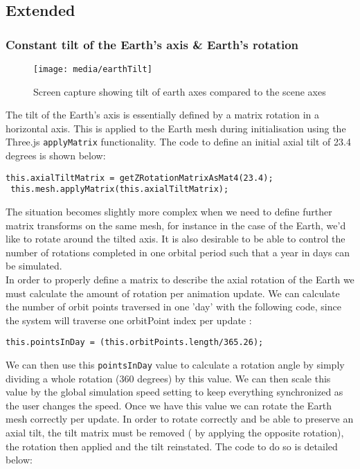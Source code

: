 \documentclass[titlepage]{article}
\begin{document}
\subsection{Extended}
\subsubsection{Constant tilt of the Earth’s axis \& Earth's rotation}

\begin{figure}[h!]
                \centering
                \texttt{[image: media/earthTilt]}
                \caption{Screen capture showing tilt of earth axes compared to the scene axes}
\end{figure}

The tilt of the Earth's axis is essentially defined by a matrix rotation in a horizontal axis. This is applied to the Earth mesh during initialisation using the Three.js \texttt{applyMatrix} functionality. The code to define an initial axial tilt of 23.4 degrees is shown below:
\begin{lstlisting}[caption=Code taken from Earth.js]
this.axialTiltMatrix = getZRotationMatrixAsMat4(23.4);
 this.mesh.applyMatrix(this.axialTiltMatrix);
\end{lstlisting}


The situation becomes slightly more complex when we need to define further matrix transforms on the same mesh, for instance in the case of the Earth, we'd like to rotate around the tilted axis. It is also desirable to be able to control the number of rotations completed in one orbital period such that a year in days can be simulated.
\\ 
In order to properly define a matrix to describe the axial rotation of the Earth we must calculate the amount of rotation per animation update. We can calculate the number of orbit points traversed in one 'day' with the following code, since the system will traverse one orbitPoint index per update :

\begin{lstlisting}[caption=Code taken from Earth.js]
 this.pointsInDay = (this.orbitPoints.length/365.26);
\end{lstlisting}
We can then use this \texttt{pointsInDay} value to calculate a rotation angle by simply dividing a whole rotation (360 degrees) by this value. We can then scale this value by the global simulation speed setting to keep everything synchronized as the user changes the speed. Once we have this value we can rotate the Earth mesh correctly per update. In order to rotate correctly and be able to preserve an axial tilt, the tilt matrix must be removed ( by applying the opposite rotation), the rotation then applied and the tilt reinstated. The code to do  so is detailed below:
\end{document}
